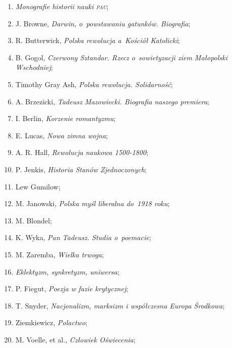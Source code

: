 \documentclass[a4paper,11pt]{article}
\begin{document}
\begin{enumerate}
\item \emph{Monografie historii nauki \textsc{pau}};

\item J. Browne, \emph{Darwin, o~powstawaniu gatunków. Biografia};

\item R. Butterwick, \emph{Polska rewolucja a~Kościół Katolicki};

\item B. Gogol, \emph{Czerwony Sztandar. Rzecz o~sowietyzacji ziem
    Małopolski Wschodniej};

\item Timothy Gray Ash, \emph{Polska rewolucja. Solidarność};

\item A. Brzezicki, \emph{Tadeusz Mazowiecki. Biografia naszego
    premiera};

\item I. Berlin, \emph{Korzenie romantyzmu};

\item E. Lucas, \emph{Nowa zimna wojna};

\item A. R. Hall, \emph{Rewolucja naukowa 1500-1800};

\item P. Jenkis, \emph{Historia Stanów Zjednoczonych};

\item Lew Gumilow;

\item M. Janowski, \emph{Polska myśl liberalna do~1918 roku};

\item M. Blondel;

\item K. Wyka, \emph{Pan Tadeusz. Studia o~poemacie};

\item M. Zaremba, \emph{Wielka trwoga};

\item \emph{Eklektyzm, synkretyzm, uniwersa};

\item P. Fiegut, \emph{Poezja w fazie krytycznej};

\item T. Snyder, \emph{Nacjonalizm, marksizm i współczesna Europa
    Środkowa};

\item Ziemkiewicz, \emph{Polactwo};

\item M. Voelle, et al., \emph{Człowiek Oświecenia};


\end{enumerate}
\end{document}
